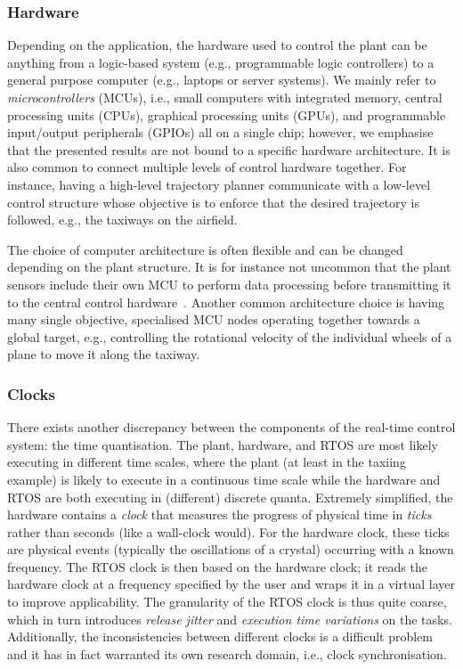 \subsubsection{Hardware}%
%
Depending on the application, the hardware used to control the plant can be anything from a logic-based system (e.g., programmable logic controllers) to a general purpose computer (e.g., laptops or server systems).
We mainly refer to \emph{microcontrollers} (MCUs), i.e., small computers with integrated memory, central processing units (CPUs), graphical processing units (GPUs), and programmable input/output peripherals (GPIOs) all on a single chip; however, we emphasise that the presented results are not bound to a specific hardware architecture.
It is also common to connect multiple levels of control hardware together.
For instance, having a high-level trajectory planner communicate with a low-level control structure whose objective is to enforce that the desired trajectory is followed, e.g., the taxiways on the airfield.

The choice of computer architecture is often flexible and can be changed depending on the plant structure.
It is for instance not uncommon that the plant sensors include their own MCU to perform data processing before transmitting it to the central control hardware~\addref{}.
Another common architecture choice is having many single objective, specialised MCU nodes operating together towards a global target, e.g., controlling the rotational velocity of the individual wheels of a plane to move it along the taxiway.

\subsubsection{Clocks}%
%
There exists another discrepancy between the components of the real-time control system: the time quantisation.
The plant, hardware, and RTOS are most likely executing in different time scales, where the plant (at least in the taxiing example) is likely to execute in a continuous time scale while the hardware and RTOS are both executing in (different) discrete quanta.
Extremely simplified, the hardware contains a \emph{clock} that measures the progress of physical time in \emph{ticks} rather than seconds (like a wall-clock would).
For the hardware clock, these ticks are physical events (typically the oscillations of a crystal) occurring with a known frequency.
The RTOS clock is then based on the hardware clock; it reads the hardware clock at a frequency specified by the user and wraps it in a virtual layer to improve applicability. 
The granularity of the RTOS clock is thus quite coarse, which in turn introduces \emph{release jitter} and \emph{execution time variations} on the tasks.
Additionally, the inconsistencies between different clocks is a difficult problem and it has in fact warranted its own research domain, i.e., clock synchronisation.

